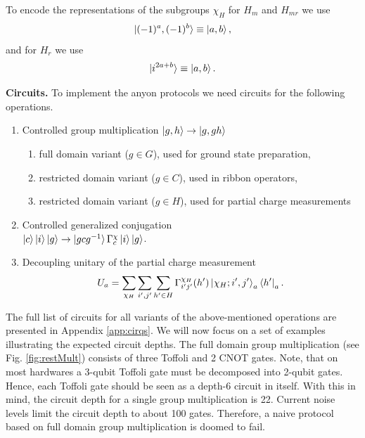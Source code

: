 \documentclass[two column]{article}
\newcommand{\caro}[1]{\textcolor{red}{[#1]}}
\begin{document}
To encode the representations of the subgroups $\chi_H$ for $H_m$ and $H_{mr}$ we use
\begin{equation}
    \ket{(-1)^a,(-1)^b} \equiv \ket{a,b},
\end{equation}
and for $H_{r}$ we use
\begin{equation}
    \ket{i^{2a+b}} \equiv \ket{a, b}.
\end{equation}


\textbf{Circuits.} To implement the anyon protocols we need circuits for the following operations.
\begin{enumerate}
    \item Controlled group multiplication $\ket{g, h} \rightarrow \ket{g, gh}$  \begin{enumerate}
        \item full domain variant ($g \in G$), used for ground state preparation,
        \item restricted domain variant ($g \in C$), used in ribbon operators,
        \item restricted domain variant ($g \in H$), used for partial charge measurements 
    \end{enumerate}
    \item Controlled generalized conjugation\\ $\ket{c} \ket{i}\ket{g} \rightarrow \ket{gcg^{-1}} \Gamma^\chi_{c} \ket{i}\ket{g}$.
    \item Decoupling unitary of the partial charge measurement $$ U_a = \sum_{\chi_H}\sum_{i', j'}\sum_{h'\in H}  \Gamma^{\chi_H}_{i'j'}(h')  \ket{\chi_H; i', j'}_a\bra{h'}_a. $$
\end{enumerate} 

The full list of circuits for all variants of the above-mentioned operations are presented in Appendix \ref{app:cirqs}.
We will now focus on a set of examples illustrating the expected circuit depths. The full domain group multiplication (see Fig. \ref{fig:restMult}) consists of three Toffoli and 2 CNOT gates. Note, that on most hardwares a 3-qubit Toffoli gate must be decomposed into 2-qubit gates. Hence, each Toffoli gate should be seen as a depth-6 circuit in itself. With this in mind, the circuit depth for a single group multiplication is 22. Current noise levels limit the circuit depth to about 100 gates. Therefore, a naive protocol based on full domain group multiplication is doomed to fail. 
\end{document}
